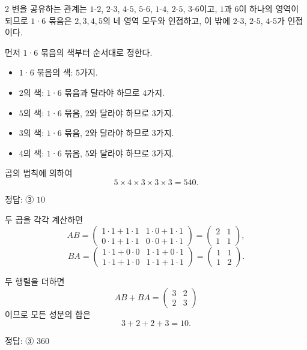 \documentclass[10pt]{article}
\begin{document}
\begin{multicols}{2}
변을 공유하는 관계는 $1$-$2$, $2$-$3$, $4$-$5$, $5$-$6$, $1$-$4$, $2$-$5$, $3$-$6$이고, $1$과 $6$이 하나의 영역이 되므로 $1$·$6$ 묶음은 $2, 3, 4, 5$의 네 영역 모두와 인접하고, 이 밖에 $2$-$3$, $2$-$5$, $4$-$5$가 인접이다.

먼저 $1$·$6$ 묶음의 색부터 순서대로 정한다.
\begin{itemize}
\item $1$·$6$ 묶음의 색: $5$가지.
\item $2$의 색: $1$·$6$ 묶음과 달라야 하므로 $4$가지.
\item $5$의 색: $1$·$6$ 묶음, $2$와 달라야 하므로 $3$가지.
\item $3$의 색: $1$·$6$ 묶음, $2$와 달라야 하므로 $3$가지.
\item $4$의 색: $1$·$6$ 묶음, $5$와 달라야 하므로 $3$가지.
\end{itemize}
곱의 법칙에 의하여
\[ 5 \times 4 \times 3 \times 3 \times 3 = 540. \]

\begin{answerbox}정답: ③ $10$\end{answerbox}

두 곱을 각각 계산하면
\[ AB = \begin{pmatrix} 1 \cdot 1 + 1 \cdot 1 & 1 \cdot 0 + 1 \cdot 1 \\ 0 \cdot 1 + 1 \cdot 1 & 0 \cdot 0 + 1 \cdot 1 \end{pmatrix} = \begin{pmatrix} 2 & 1 \\ 1 & 1 \end{pmatrix}, \]
\[ BA = \begin{pmatrix} 1 \cdot 1 + 0 \cdot 0 & 1 \cdot 1 + 0 \cdot 1 \\ 1 \cdot 1 + 1 \cdot 0 & 1 \cdot 1 + 1 \cdot 1 \end{pmatrix} = \begin{pmatrix} 1 & 1 \\ 1 & 2 \end{pmatrix}. \]

두 행렬을 더하면
\[ AB + BA = \begin{pmatrix} 3 & 2 \\ 2 & 3 \end{pmatrix} \]
이므로 모든 성분의 합은
\[ 3 + 2 + 2 + 3 = 10. \]

\begin{answerbox}정답: ③ $360$\end{answerbox}


\end{multicols}
\end{document}
